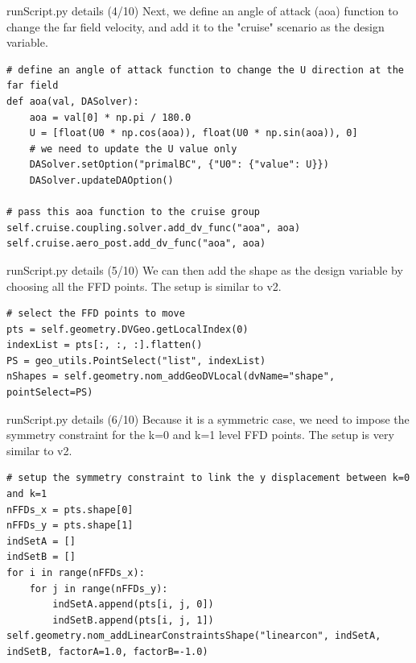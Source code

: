 \documentclass{bredelebeamer}
\begin{document}
\begin{frame}[fragile]{runScript.py details (4/10)}
Next, we define an angle of attack (aoa) function to change the far field velocity, and add it to the "cruise" scenario as the design variable.
  \footnotesize
  \lstset{ language=bash }
  \begin{lstlisting}
# define an angle of attack function to change the U direction at the far field
def aoa(val, DASolver):
    aoa = val[0] * np.pi / 180.0
    U = [float(U0 * np.cos(aoa)), float(U0 * np.sin(aoa)), 0]
    # we need to update the U value only
    DASolver.setOption("primalBC", {"U0": {"value": U}})
    DASolver.updateDAOption()

# pass this aoa function to the cruise group
self.cruise.coupling.solver.add_dv_func("aoa", aoa)
self.cruise.aero_post.add_dv_func("aoa", aoa)
  \end{lstlisting}
  \normalsize
  \end{frame}

\begin{frame}[fragile]{runScript.py details (5/10)}
We can then add the shape as the design variable by choosing all the FFD points. The setup is similar to v2.
  \footnotesize
  \lstset{ language=bash }
  \begin{lstlisting}
# select the FFD points to move
pts = self.geometry.DVGeo.getLocalIndex(0)
indexList = pts[:, :, :].flatten()
PS = geo_utils.PointSelect("list", indexList)
nShapes = self.geometry.nom_addGeoDVLocal(dvName="shape", pointSelect=PS)
  \end{lstlisting}
  \normalsize
  \end{frame}

\begin{frame}[fragile]{runScript.py details (6/10)}
Because it is a symmetric case, we need to impose the symmetry constraint for the k=0 and k=1 level FFD points. The setup is very similar to v2.
  \footnotesize
  \lstset{ language=bash }
  \begin{lstlisting}
# setup the symmetry constraint to link the y displacement between k=0 and k=1
nFFDs_x = pts.shape[0]
nFFDs_y = pts.shape[1]
indSetA = []
indSetB = []
for i in range(nFFDs_x):
    for j in range(nFFDs_y):
        indSetA.append(pts[i, j, 0])
        indSetB.append(pts[i, j, 1])
self.geometry.nom_addLinearConstraintsShape("linearcon", indSetA, indSetB, factorA=1.0, factorB=-1.0)
  \end{lstlisting}
  \normalsize
  \end{frame}
\end{document}
